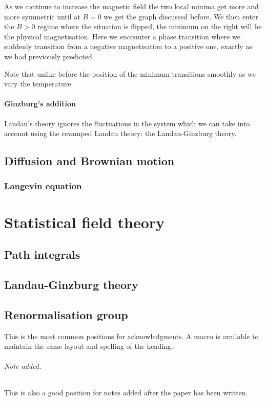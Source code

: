 \documentclass[a4paper,11pt,oneside]{book}
\begin{document}
As we continue to increase the magnetic field the two local minima get more and more symmetric until at $B=0$ we get the graph discussed before. We then enter the $B>0$ regime where the situation is flipped, the minimum on the right will be the physical magnetisation. Here we encounter a phase transition where we suddenly transition from a negative magnetisation to a positive one, exactly as we had previously predicted.

Note that unlike before the position of the minimum transitions smoothly as we vary the temperature.
\subsection*{Ginzburg's addition}
Landau's theory ignores the fluctuations in the system which we can take into account using the revamped Landau theory: the Landau-Ginzburg theory. 

\chapter{Diffusion and Brownian motion}
\section{Langevin equation}
\part{Statistical field theory}
\chapter{Path integrals}
\chapter{Landau-Ginzburg theory}
\chapter{Renormalisation group}
\acknowledgments

This is the most common positions for acknowledgments. A macro is
available to maintain the same layout and spelling of the heading.

\paragraph{Note added.} This is also a good position for notes added
after the paper has been written.
\end{document}
